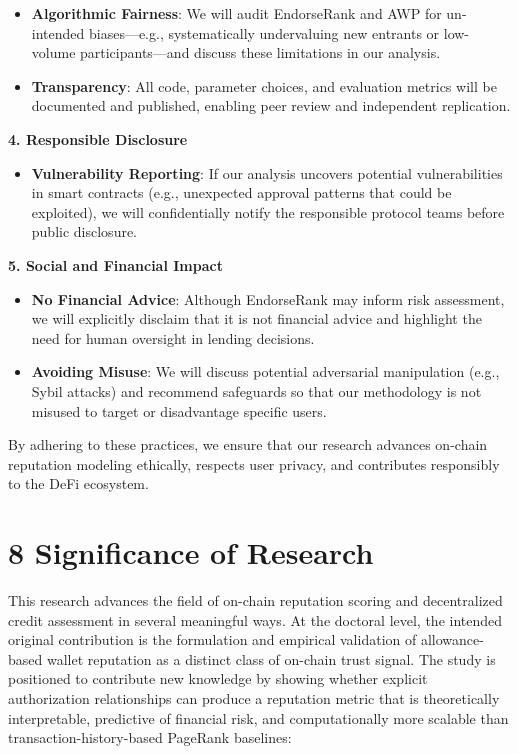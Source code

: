 \documentclass[12pt]{article}
\newcommand{\proposalSubheading}[1]{%
  \par\addvspace{0.38\baselineskip}%
  \noindent\textbf{#1}\par\nobreak\addvspace{0.08\baselineskip}%
}
\begin{document}
\begin{itemize}
\item[\textbullet] \textbf{Algorithmic Fairness}: We will audit EndorseRank and AWP for un- intended biases---e.g., systematically undervaluing new entrants or low- volume participants---and discuss these limitations in our analysis.
\item[\textbullet] \textbf{Transparency}: All code, parameter choices, and evaluation metrics will be documented and published, enabling peer review and independent replication.
\end{itemize}
\proposalSubheading{4. Responsible Disclosure}

\begin{itemize}
\item[\textbullet] \textbf{Vulnerability Reporting}: If our analysis uncovers potential vulnerabilities in smart contracts (e.g., unexpected approval patterns that could be exploited), we will confidentially notify the responsible protocol teams before public disclosure.
\end{itemize}
\proposalSubheading{5. Social and Financial Impact}

\begin{itemize}
\item[\textbullet] \textbf{No Financial Advice}: Although EndorseRank may inform risk assessment, we will explicitly disclaim that it is not financial advice and highlight the need for human oversight in lending decisions.
\item[\textbullet] \textbf{Avoiding Misuse}: We will discuss potential adversarial manipulation (e.g., Sybil attacks) and recommend safeguards so that our methodology is not misused to target or disadvantage specific users.
\end{itemize}
By adhering to these practices, we ensure that our research advances on-chain reputation modeling ethically, respects user privacy, and contributes responsibly to the DeFi ecosystem.


\clearpage
{}
\section*{8 \textbf{Significance of Research}}
\label{sec:significance-of-research}

This research advances the field of on-chain reputation scoring and decentralized credit assessment in several meaningful ways. At the doctoral level, the intended original contribution is the formulation and empirical validation of allowance-based wallet reputation as a distinct class of on-chain trust signal. The study is positioned to contribute new knowledge by showing whether explicit authorization relationships can produce a reputation metric that is theoretically interpretable, predictive of financial risk, and computationally more scalable than transaction-history-based PageRank baselines:
\end{document}
